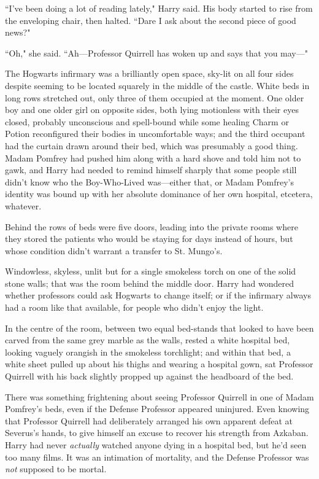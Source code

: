 ``I've been doing a lot of reading lately," Harry said. His body started to rise from the enveloping chair, then halted. ``Dare I ask about the second piece of good news?"

``Oh," she said. ``Ah—Professor Quirrell has woken up and says that you may—"

\later

The Hogwarts infirmary was a brilliantly open space, sky-lit on all four sides despite seeming to be located squarely in the middle of the castle. White beds in long rows stretched out, only three of them occupied at the moment. One older boy and one older girl on opposite sides, both lying motionless with their eyes closed, probably unconscious and spell-bound while some healing Charm or Potion reconfigured their bodies in uncomfortable ways; and the third occupant had the curtain drawn around their bed, which was presumably a good thing. Madam Pomfrey had pushed him along with a hard shove and told him not to gawk, and Harry had needed to remind himself sharply that some people still didn't know who the Boy-Who-Lived was—either that, or Madam Pomfrey's identity was bound up with her absolute dominance of her own hospital, etcetera, whatever.

Behind the rows of beds were five doors, leading into the private rooms where they stored the patients who would be staying for days instead of hours, but whose condition didn't warrant a transfer to St. Mungo's.

Windowless, skyless, unlit but for a single smokeless torch on one of the solid stone walls; that was the room behind the middle door. Harry had wondered whether professors could ask Hogwarts to change itself; or if the infirmary always had a room like that available, for people who didn't enjoy the light.

In the centre of the room, between two equal bed-stands that looked to have been carved from the same grey marble as the walls, rested a white hospital bed, looking vaguely orangish in the smokeless torchlight; and within that bed, a white sheet pulled up about his thighs and wearing a hospital gown, sat Professor Quirrell with his back slightly propped up against the headboard of the bed.

There was something frightening about seeing Professor Quirrell in one of Madam Pomfrey's beds, even if the Defense Professor appeared uninjured. Even knowing that Professor Quirrell had deliberately arranged his own apparent defeat at Severus's hands, to give himself an excuse to recover his strength from Azkaban. Harry had never \emph{actually} watched anyone dying in a hospital bed, but he'd seen too many films. It was an intimation of mortality, and the Defense Professor was \emph{not} supposed to be mortal.

